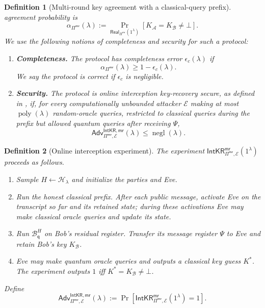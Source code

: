 \documentclass[11pt]{article}
\newtheorem{definition}[definition]{Definition}
\newcommand{\cA}{\mathcal{A}}
\newcommand{\cB}{\mathcal{B}}
\newcommand{\cE}{\mathcal{E}}
\newcommand{\cH}{\mathcal{H}}
\newcommand{\poly}{\operatorname{poly}}
\newcommand{\negl}{\operatorname{negl}}
\newcommand{\Real}{\mathsf{Real}}
\newcommand{\IntKR}{\mathsf{IntKR}}
\newcommand{\Adv}{\mathsf{Adv}}
\begin{document}
\begin{definition}[Multi-round key agreement with a classical-query prefix]
agreement probability is
\[
  \alpha_{\Pi^{\mathsf{mr}}}(\lambda)
  :=
  \Pr_{\Real_{\Pi^{\mathsf{mr}}}(1^\lambda)}
  [K_{\cA}=K_{\cB}\neq\bot].
\]
We use the following notions of completeness and security for such a protocol:
\begin{enumerate}[leftmargin=2em,label=\textup{(\roman*)}]
  \item \textbf{Completeness.}  The protocol has completeness error
  \(\epsilon_c(\lambda)\) if
  \[
    \alpha_{\Pi^{\mathsf{mr}}}(\lambda)
    \ge 1-\epsilon_c(\lambda).
  \]
  We say the protocol is \emph{correct} if \(\epsilon_c\) is negligible.
  \item \textbf{Security.}  The protocol is online interception key-recovery
  secure, as defined in , if, for every
  computationally unbounded attacker \(\cE\) making at most \(\poly(\lambda)\)
  random-oracle queries, restricted to classical queries during the prefix
  but allowed quantum queries after receiving \(\Psi\),
  \begin{equation}
    \Adv^{\IntKR,\mathsf{mr}}_{\Pi^{\mathsf{mr}},\cE}(\lambda)
    \leq \negl(\lambda).
  \end{equation}
\end{enumerate}
\end{definition}

\begin{definition}[Online interception experiment]
\label{def:multi-intkr}
The experiment
\(\IntKR^{\mathsf{mr}}_{\Pi^{\mathsf{mr}},\cE}(1^\lambda)\) proceeds as
follows.
\begin{enumerate}[leftmargin=2em]
  \item Sample \(H\leftarrow\cH_\lambda\) and initialize the parties and Eve.
  \item Run the honest classical prefix. After each public message, activate
  Eve on the transcript so far and its retained state; during these
  activations Eve may make classical oracle queries and update its state.
  \item Run \(\cB_{\mathsf q}^H\) on Bob's residual register. Transfer its
  message register \(\Psi\) to Eve and retain Bob's key \(K_{\cB}\).
  \item Eve may make quantum oracle queries and outputs a classical key guess
  \(K^*\). The experiment outputs \(1\) iff
  \(K^*=K_{\cB}\neq\bot\).
\end{enumerate}
Define
\[
  \Adv^{\IntKR,\mathsf{mr}}_{\Pi^{\mathsf{mr}},\cE}(\lambda)
  :=
  \Pr[\IntKR^{\mathsf{mr}}_{\Pi^{\mathsf{mr}},\cE}(1^\lambda)=1].
\]
\end{definition}
\end{document}
